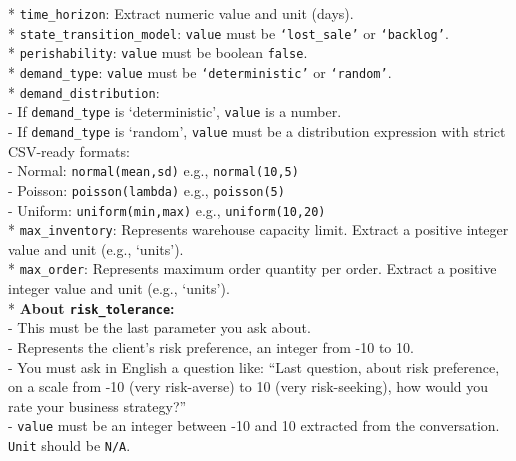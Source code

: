 \documentclass[mnsc,nonblindrev]{informs3_hide}
\begin{document}
\begin{APPENDICES}
\begin{table}[h]
\begin{tcolorbox}
    * \texttt{time\_horizon}: Extract numeric value and unit (days). \\
    * \texttt{state\_transition\_model}: \texttt{value} must be \texttt{`lost\_sale'} or \texttt{`backlog'}. \\
    * \texttt{perishability}: \texttt{value} must be boolean \texttt{false}. \\
    * \texttt{demand\_type}: \texttt{value} must be \texttt{`deterministic'} or \texttt{`random'}. \\
    * \texttt{demand\_distribution}: \\
    \hspace*{1em} - If \texttt{demand\_type} is `deterministic', \texttt{value} is a number. \\
    \hspace*{1em} - If \texttt{demand\_type} is `random', \texttt{value} must be a distribution expression with strict CSV-ready formats: \\
    \hspace*{2em} - Normal: \texttt{normal(mean,sd)} e.g., \texttt{normal(10,5)} \\
    \hspace*{2em} - Poisson: \texttt{poisson(lambda)} e.g., \texttt{poisson(5)} \\
    \hspace*{2em} - Uniform: \texttt{uniform(min,max)} e.g., \texttt{uniform(10,20)} \\
    * \texttt{max\_inventory}: Represents warehouse capacity limit. Extract a positive integer value and unit (e.g., `units'). \\
    * \texttt{max\_order}: Represents maximum order quantity per order. Extract a positive integer value and unit (e.g., `units').\\

    * \textbf{About \texttt{risk\_tolerance}:} \\
    \hspace*{1em} - This must be the last parameter you ask about. \\
    \hspace*{1em} - Represents the client's risk preference, an integer from -10 to 10. \\
    \hspace*{1em} - You must ask in English a question like: ``Last question, about risk preference, on a scale from -10 (very risk-averse) to 10 (very risk-seeking), how would you rate your business strategy?'' \\
    \hspace*{1em} - \texttt{value} must be an integer between -10 and 10 extracted from the conversation. \texttt{Unit} should be \texttt{N/A}.\\


\end{tcolorbox}
\end{table}
\end{APPENDICES}
\end{document}
